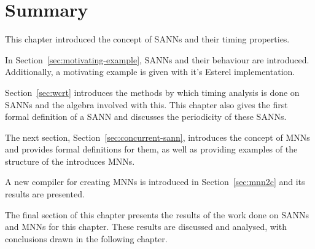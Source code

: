 \section{Summary}
This chapter introduced the concept of \acfp{SANN} and their timing properties.

In Section~\ref{sec:motivating-example}, \acp{SANN} and their behaviour are introduced. 
Additionally, a motivating example is given with it's Esterel implementation.

Section~\ref{sec:wcrt} introduces the methods by which timing analysis is done on \acp{SANN} and the algebra involved with this.
This chapter also gives the first formal definition of a \ac{SANN} and discusses the periodicity of these \acp{SANN}.

The next section, Section~\ref{sec:concurrent-sann}, introduces the concept of \acfp{MNN} and provides formal definitions for them, as well as providing examples of the structure of the introduces \acp{MNN}.

A new compiler for creating \acp{MNN} is introduced in Section~\ref{sec:mnn2c} and its results are presented.

The final section of this chapter presents the results of the work done on \acp{SANN} and \acp{MNN} for this chapter.
These results are discussed and analysed, with conclusions drawn in the following chapter.

